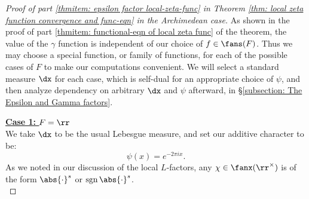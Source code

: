 \documentclass[11pt, x11names, openany]{book}
\begin{document}
\begin{proof}[Proof of part \ref{thmitem: epsilon factor local-zeta-func} in Theorem \ref{thm: local zeta function convergence and func-eqn} in the Archimedean case]
As shown in the proof of part \ref{thmitem: functional-eqn of local zeta func} of the theorem, the value of the $\gamma$ function is independent of our choice of $f \in \fans(F)$. Thus we may choose a special function, or family of functions, for each of the possible cases of $F$ to make our computations convenient. We will select a standard measure $\dx$ for each case, which is self-dual for an appropriate choice of $\psi$, and then analyze dependency on arbitrary $\dx$ and $\psi$ afterward, in \S \ref{subsection: The Epsilon and Gamma factors}.

\textbf{\underline{Case 1: $F = \rr$}}\\
We take $\dx$ to be the usual Lebesgue measure, and set our additive character to be:
\begin{equation*}
    \psi(x) = e^{- 2 \pi i x}.
\end{equation*}
As we noted in our discussion of the local $L$-factors, any $\chi \in \fanx(\rr^\times)$ is of the form $\abs{\cdot}^s$ or $\sgn \abs{\cdot}^s$.\\


\end{proof}
\end{document}
